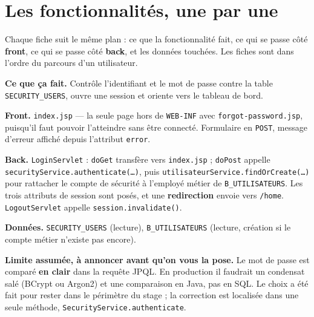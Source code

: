 \section{Les fonctionnalités, une par une}

Chaque fiche suit le même plan : ce que la fonctionnalité fait, ce qui se passe
côté \textbf{front}, ce qui se passe côté \textbf{back}, et les données
touchées. Les fiches sont dans l'ordre du parcours d'un utilisateur.


\textbf{Ce que ça fait.} Contrôle l'identifiant et le mot de passe contre la
table \texttt{SECURITY\_USERS}, ouvre une session et oriente vers le tableau de
bord.

\textbf{Front.} \texttt{index.jsp} --- la seule page hors de \texttt{WEB-INF}
avec \texttt{forgot-password.jsp}, puisqu'il faut pouvoir l'atteindre sans être
connecté. Formulaire en \texttt{POST}, message d'erreur affiché depuis
l'attribut \texttt{error}.

\textbf{Back.} \texttt{LoginServlet} : \texttt{doGet} transfère vers
\texttt{index.jsp} ; \texttt{doPost} appelle
\texttt{securityService.authenticate(\dots)}, puis
\texttt{utilisateurService.findOrCreate(\dots)} pour rattacher le compte de
sécurité à l'employé métier de \texttt{B\_UTILISATEURS}. Les trois attributs de
session sont posés, et une \textbf{redirection} envoie vers \texttt{/home}.
\texttt{LogoutServlet} appelle \texttt{session.invalidate()}.

\textbf{Données.} \texttt{SECURITY\_USERS} (lecture), \texttt{B\_UTILISATEURS}
(lecture, création si le compte métier n'existe pas encore).

\begin{attention}
\textbf{Limite assumée, à annoncer avant qu'on vous la pose.} Le mot de passe
est comparé \textbf{en clair} dans la requête JPQL. En production il faudrait
un condensat salé (BCrypt ou Argon2) et une comparaison en Java, pas en SQL.
Le choix a été fait pour rester dans le périmètre du stage ; la correction est
localisée dans une seule méthode, \texttt{SecurityService.authenticate}.
\end{attention}


